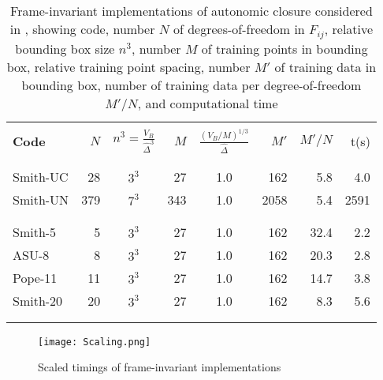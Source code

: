 %
%

\begin{table}[tb]
	\label{tab:2}
	\centering

	\caption{Frame-invariant implementations of autonomic closure considered in , showing code, number $N$ of degrees-of-freedom in $F_{ij}$, relative bounding box size $n^3$, number $M$ of training points in bounding box, relative training point spacing, number $M'$ of training data in bounding box, number of training data per degree-of-freedom $M'/N$, and computational time  \vspace{0.5cm}}

	\begin{tabular}{lrcrcrrr}
	\hline \\

	\textbf{Code} & 
	$N$ & 
	$n^3 = \frac{V_B}{\widehat{\Delta}^3}$ & 
	$M$ &
	$\frac{(V_B/M)^{1/3}}{\widehat{\Delta}}$ &
	$M'$ & 
	$M'/N$ & 
	t(s)	\\ \\

	\hline \\
		Smith-UC	&	28	&	$3^3$	&	27	&	1.0	&	162	&	5.8	& 4.0	\\
		Smith-UN	&	379	&	$7^3$	&	343	&	1.0 &	2058&	5.4	& 2591	\\ \\
	\hline \\
		Smith-5		&	5	&	$3^3$	&	27	&	1.0	&	162	&	32.4 & 2.2	\\
		ASU-8		&	8	&	$3^3$	&	27	&	1.0	&	162	&	20.3 & 2.8	\\ 
		Pope-11		&	11	&	$3^3$	&	27	&	1.0 &	162	&	14.7 & 3.8	\\ 
		Smith-20	&	20	&	$3^3$	&	27	&	1.0 &	162	&	8.3	 & 5.6	\\ \\
	\hline	\\
	\end{tabular}	
\end{table}

%
%         


 


%
\begin{figure}
	\begin{center} 
	\texttt{[image: Scaling.png]}
	\caption{Scaled timings of frame-invariant implementations}
	\label{F:comp_time}
	\end{center}
\end{figure}
%
%






